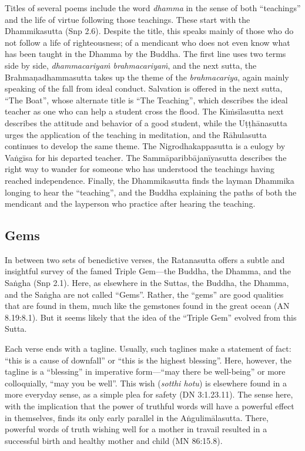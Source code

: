 \documentclass[12pt,openany]{book}%
\begin{document}
Titles of several poems include the word \textit{dhamma} in the sense of both “teachings” and the life of virtue following those teachings. These start with the Dhammikasutta (Snp 2.6). Despite the title, this speaks mainly of those who do not follow a life of righteousness; of a mendicant who does not even know what has been taught in the Dhamma by the Buddha. The first line uses two terms side by side, \textit{\textsanskrit{dhammacariyaṁ} \textsanskrit{brahmacariyaṁ}}, and the next sutta, the \textsanskrit{Brahmaṇadhammasutta} takes up the theme of the \textit{brahmacariya}, again mainly speaking of the fall from ideal conduct. Salvation is offered in the next sutta, “The Boat”, whose alternate title is “The Teaching”, which describes the ideal teacher as one who can help a student cross the flood. The \textsanskrit{Kiṁsīlasutta} next describes the attitude and behavior of a good student, while the \textsanskrit{Uṭṭhānasutta} urges the application of the teaching in meditation, and the \textsanskrit{Rāhulasutta} continues to develop the same theme. The Nigrodhakappasutta is a eulogy by \textsanskrit{Vaṅgīsa} for his departed teacher. The \textsanskrit{Sammāparibbājanīyasutta} describes the right way to wander for someone who has understood the teachings having reached independence. Finally, the Dhammikasutta finds the layman Dhammika longing to hear the “teaching”, and the Buddha explaining the paths of both the mendicant and the layperson who practice after hearing the teaching.

\subsection*{Gems}

In between two sets of benedictive verses, the Ratanasutta offers a subtle and insightful survey of the famed Triple Gem—the Buddha, the Dhamma, and the \textsanskrit{Saṅgha} (Snp 2.1). Here, as elsewhere in the Suttas, the Buddha, the Dhamma, and the \textsanskrit{Saṅgha} are not called “Gems”. Rather, the “gems” are good qualities that are found in them, much like the gemstones found in the great ocean (AN 8.19:8.1). But it seems likely that the idea of the “Triple Gem” evolved from this Sutta.

Each verse ends with a tagline. Usually, such taglines make a statement of fact: “this is a cause of downfall” or “this is the highest blessing”. Here, however, the tagline is a “blessing” in imperative form—“may there be well-being” or more colloquially, “may you be well”. This wish (\textit{sotthi hotu}) is elsewhere found in a more everyday sense, as a simple plea for safety (DN 3:1.23.11). The sense here, with the implication that the power of truthful words will have a powerful effect in themselves, finds its only early parallel in the \textsanskrit{Aṅgulimālasutta}. There, powerful words of truth wishing well for a mother in travail resulted in a successful birth and healthy mother and child (MN 86:15.8).
\end{document}
